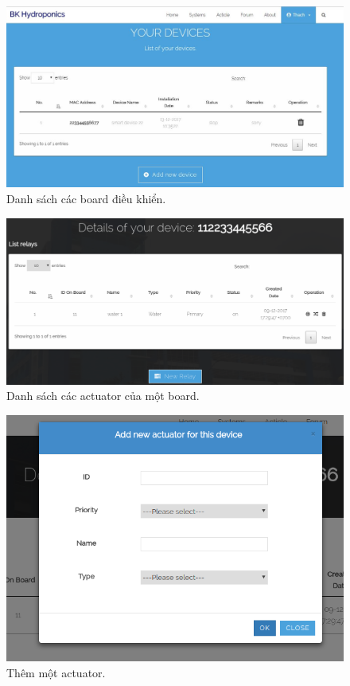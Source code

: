 \documentclass[a4paper,12pt,oneside]{article}
\begin{document}
\begin{center}
\begin{figure}[H]
\centering
\includegraphics[scale=.5]{hinh/web_devices.jpg}
\caption{Danh sách các board điều khiển.}
\end{figure}

\begin{figure}[H]
\centering
\includegraphics[scale=.55]{hinh/web_actuator_list.png}
\caption{Danh sách các actuator của một board.}
\end{figure}

\begin{figure}[H]
\centering
\includegraphics[scale=.5]{hinh/web_add_actuator.png}
\caption{Thêm một actuator.}
\end{figure}


\end{center}
\end{document}
